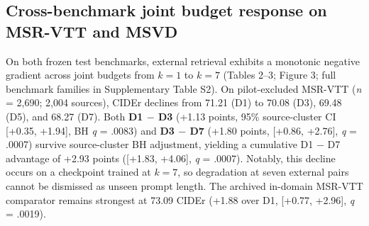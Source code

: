 \documentclass[11pt,a4paper]{article}
\begin{document}
\subsection{Cross-benchmark joint budget response on MSR-VTT and MSVD}
On both frozen test benchmarks, external retrieval exhibits a monotonic negative gradient across joint budgets from $k=1$ to $k=7$ (Tables 2--3; Figure 3; full benchmark families in Supplementary Table S2). On pilot-excluded MSR-VTT (\emph{n} = 2,690; 2,004 sources), CIDEr declines from 71.21 (D1) to 70.08 (D3), 69.48 (D5), and 68.27 (D7). Both \textbf{D1 $-$ D3} (+1.13 points, 95\% source-cluster CI [+0.35, +1.94], BH \emph{q} = .0083) and \textbf{D3 $-$ D7} (+1.80 points, [+0.86, +2.76], \emph{q} = .0007) survive source-cluster BH adjustment, yielding a cumulative D1 $-$ D7 advantage of +2.93 points ([+1.83, +4.06], \emph{q} = .0007). Notably, this decline occurs on a checkpoint trained at $k=7$, so degradation at seven external pairs cannot be dismissed as unseen prompt length. The archived in-domain MSR-VTT comparator remains strongest at 73.09 CIDEr (+1.88 over D1, [+0.77, +2.96], \emph{q} = .0019).

\begin{table}[t]
\centering
\footnotesize
\caption{Frozen test-set PTB CIDEr means on pilot-excluded MSR-VTT (\emph{n} = 2,690) and MSVD (\emph{n} = 670) using the FULL external VideoUFO memory. The MSR-VTT in-domain comparator uses training captions; separately attributed MSVD in-domain references (published 158.1; archival reproduction 158.32) are documented in Supplementary Materials S3.}
\label{tab:2}
\end{table}
\end{document}
